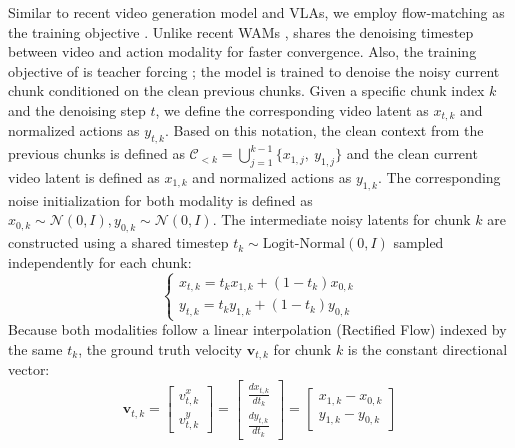 Similar to recent video generation model and VLAs, we employ flow-matching as the training objective \citep{wan2025wan, ali2025world, teng2025magi}. Unlike recent WAMs \citep{zhu2025unified, anonymous2025cosmos, li2025unified, liao2025genie}, \ourmethod shares the denoising timestep between video and action modality for faster convergence. 
Also, the training objective of \ourmethod is teacher forcing \citep{jin2024pyramidal, gao2024ca2}; the model is trained to denoise the noisy current chunk conditioned on the clean previous chunks. 
Given a specific chunk index $k$ and the denoising step $t$, we define the corresponding video latent as $x_{t,k}$ and normalized actions as $y_{t,k}$. Based on this notation, the clean context from the previous chunks is defined as $\mathcal{C}_{<k} = \bigcup_{j=1}^{k-1} \{x_{1, j}, \ y_{1, j}\}$ and the clean current video latent is defined as $x_{1,k}$ and normalized actions as $y_{1,k}$. The corresponding noise initialization for both modality is defined as $x_{0,k} \sim \mathcal{N}(0,I), y_{0,k} \sim \mathcal{N}(0,I)$. The intermediate noisy latents for chunk $k$ are constructed using a shared timestep $t_k \sim \text{Logit-Normal}(0, I)$ sampled independently for each chunk:
\begin{equation}
    \begin{cases}
        x_{t,k} = t_k x_{1,k} + (1 - t_k) x_{0,k} \\
        y_{t,k} = t_k y_{1,k} + (1 - t_k) y_{0,k}
    \end{cases}
\end{equation}
Because both modalities follow a linear interpolation (Rectified Flow) indexed by the same $t_k$, the ground truth velocity $\mathbf{v}_{t,k}$ for chunk $k$ is the constant directional vector: 
\begin{equation}
    \mathbf{v}_{t,k} = \begin{bmatrix} v_{t,k}^x \\ v_{t,k}^y \end{bmatrix} = \begin{bmatrix} \frac{dx_{t,k}}{dt_k} \\ \frac{dy_{t,k}}{dt_k} \end{bmatrix} = \begin{bmatrix} x_{1,k} - x_{0,k} \\ y_{1,k} - y_{0,k} \end{bmatrix}
\end{equation}

